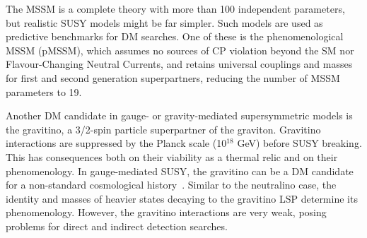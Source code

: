 The MSSM is a complete theory with more than 100 independent parameters, 
but realistic SUSY models might be far simpler.%
Such models are used as predictive benchmarks for DM searches. 
One of these is the phenomenological MSSM (pMSSM), which assumes no sources of CP violation beyond the SM nor Flavour-Changing Neutral Currents, and retains universal couplings and masses for first and second generation superpartners, reducing
the number of MSSM parameters to 19. 

Another DM candidate in gauge- or gravity-mediated supersymmetric models is the gravitino, 
a 3/2-spin particle superpartner of the graviton. 
Gravitino interactions are suppressed by the Planck scale (10$^{18}$ GeV) before SUSY breaking.
This has consequences both on their viability as a thermal relic and on their phenomenology. 
In gauge-mediated SUSY, the gravitino can be a DM candidate for a
non-standard cosmological history~\cite{Steffen:2007sp}. 
Similar to the neutralino case, the identity and masses of heavier states decaying to the gravitino LSP determine its phenomenology. However, the gravitino interactions are very weak, posing problems for 
direct and indirect detection searches. 


